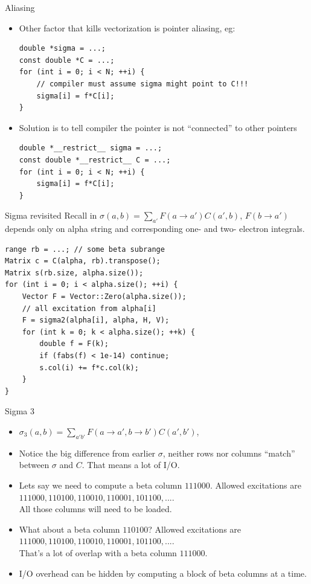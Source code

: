 \documentclass{beamer}
\begin{document}
\begin{frame}[fragile]{Aliasing}
\begin{itemize}

\item Other factor that kills vectorization is pointer aliasing, eg:
\begin{verbatim}
double *sigma = ...;
const double *C = ...; 
for (int i = 0; i < N; ++i) {
    // compiler must assume sigma might point to C!!!
    sigma[i] = f*C[i];
}
\end{verbatim}

\item Solution is to tell compiler the pointer is not ``connected'' to other pointers
\begin{verbatim}
double *__restrict__ sigma = ...;
const double *__restrict__ C = ...; 
for (int i = 0; i < N; ++i) {
    sigma[i] = f*C[i];
}
\end{verbatim}
 
\end{itemize}
\end{frame}

\begin{frame}[fragile]{Sigma revisited}
  Recall in $\sigma(a,b) = \sum_{a'} F(a \rightarrow a') C(a',b)$, 
  $F(b \rightarrow a')$ depends only on alpha string and corresponding one- and two- electron integrals.
\begin{verbatim}
range rb = ...; // some beta subrange 
Matrix c = C(alpha, rb).transpose();
Matrix s(rb.size, alpha.size());
for (int i = 0; i < alpha.size(); ++i) {
    Vector F = Vector::Zero(alpha.size());
    // all excitation from alpha[i]
    F = sigma2(alpha[i], alpha, H, V);
    for (int k = 0; k < alpha.size(); ++k) {
        double f = F(k);
        if (fabs(f) < 1e-14) continue;
        s.col(i) += f*c.col(k);
    }
}
\end{verbatim}
\end{frame}

\begin{frame}[fragile]{Sigma 3}
\begin{itemize}
\item $\sigma_3(a,b) = \sum_{a'b'} F(a \rightarrow a', b \rightarrow b') C(a',b')$, 
\item Notice the big difference from earlier $\sigma$,
  neither rows nor columns ``match'' between $\sigma$ and $C$.
  That means a lot of I/O.
\item Lets say we need to compute a beta column $111000$.  Allowed excitations are  \\
$111000, 110100, 110010, 110001, 101100, ...$. \\
All those columns will need to be loaded.
\item What about a beta column $110100$?  Allowed excitations are \\
$111000, 110100, 110010, 110001, 101100, ...$. \\
That's a lot of overlap with a beta column $111000$.
\item I/O overhead can be hidden by computing a block of beta columns at a time.
\end{itemize}
\end{frame}
\end{document}
